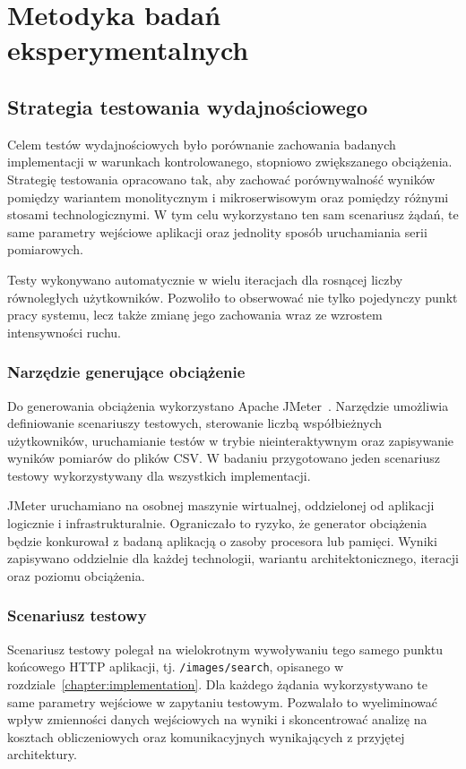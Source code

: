 \chapter{Metodyka badań eksperymentalnych}
\label{chapter:experiment_methodology}
\section{Strategia testowania wydajnościowego}

Celem testów wydajnościowych było porównanie zachowania badanych implementacji w warunkach kontrolowanego, stopniowo zwiększanego obciążenia. Strategię testowania opracowano tak, aby zachować porównywalność wyników pomiędzy wariantem monolitycznym i mikroserwisowym oraz pomiędzy różnymi stosami technologicznymi. W tym celu wykorzystano ten sam scenariusz żądań, te same parametry wejściowe aplikacji oraz jednolity sposób uruchamiania serii pomiarowych.

Testy wykonywano automatycznie w wielu iteracjach dla rosnącej liczby równoległych użytkowników. Pozwoliło to obserwować nie tylko pojedynczy punkt pracy systemu, lecz także zmianę jego zachowania wraz ze wzrostem intensywności ruchu.

\subsection{Narzędzie generujące obciążenie}

Do generowania obciążenia wykorzystano Apache JMeter~\cite{jmeterdocs}. Narzędzie umożliwia definiowanie scenariuszy testowych, sterowanie liczbą współbieżnych użytkowników, uruchamianie testów w trybie nieinteraktywnym oraz zapisywanie wyników pomiarów do plików CSV. W badaniu przygotowano jeden scenariusz testowy wykorzystywany dla wszystkich implementacji.

JMeter uruchamiano na osobnej maszynie wirtualnej, oddzielonej od aplikacji logicznie i infrastrukturalnie. Ograniczało to ryzyko, że generator obciążenia będzie konkurował z badaną aplikacją o zasoby procesora lub pamięci. Wyniki zapisywano oddzielnie dla każdej technologii, wariantu architektonicznego, iteracji oraz poziomu obciążenia.

\subsection{Scenariusz testowy}

Scenariusz testowy polegał na wielokrotnym wywoływaniu tego samego punktu końcowego HTTP aplikacji, tj. \texttt{/images/search}, opisanego w rozdziale~\ref{chapter:implementation}. Dla każdego żądania wykorzystywano te same parametry wejściowe w zapytaniu testowym. Pozwalało to wyeliminować wpływ zmienności danych wejściowych na wyniki i skoncentrować analizę na kosztach obliczeniowych oraz komunikacyjnych wynikających z przyjętej architektury.


